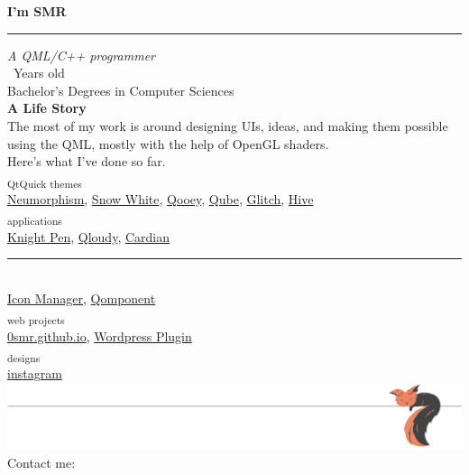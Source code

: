 




    \FPeval{}

	\begin{center}
	    \noindent \textbf{I'm SMR}
	    \noindent\textcolor{gray}{\rule{\linewidth}{0.5pt}}
	    \textit{A QML/C++ programmer}\\[5mm]
	    \myage\ Years old\\
	    Bachelor's Degrees in Computer Sciences\\[5mm]
	    \textbf{\large A Life Story}\\
	    The most of my work is around designing UIs, ideas, and making them possible using the QML, mostly with the help of OpenGL shaders.\\
	    Here's what I've done so far.\\
	    \textsubscript{QtQuick themes}\\
		\href{https://github.com/0smr/qml-neumorphism}{Neumorphism},
		\href{https://github.com/0smr/qml-snow-white}{Snow White},
		\href{https://github.com/0smr/qooey}{Qooey},
		\href{https://github.com/0smr/qube}{Qube},
		\href{https://github.com/0smr/glitch}{Glitch},
		\href{https://github.com/0smr/hive}{Hive}
		\\[5mm]
	    \textsubscript{applications}\\
	    \href{https://github.com/0smr/knight-pen}{Knight Pen},
	    \href{https://github.com/0smr/qloudy}{Qloudy},
	    \href{https://github.com/cardianco/cardian}{Cardian}\\[-2mm]
	    \noindent\textcolor{blueLink}{\hfil\rule{6cm}{0.5pt}\hfil}\\
	    \href{https://github.com/0smr/icon-manager}{Icon Manager},
	    \href{https://github.com/0smr/qomponent}{Qomponent}
		\\[5mm]
	    \textsubscript{web projects}\\
	    \href{https://0smr.github.io}{0smr.github.io},
	    \href{https://github.com/0smr/smr-wp-plugin}{Wordpress Plugin}
		\\[5mm]
	    \textsubscript{designs}\\
	    \href{https://www.instagram.com/one.red.little.fish}{instagram}
		\includegraphics[width=\linewidth]{./sleeping-fox.pdf}\vspace*{-13mm}
	    Contact me:
	\end{center}
